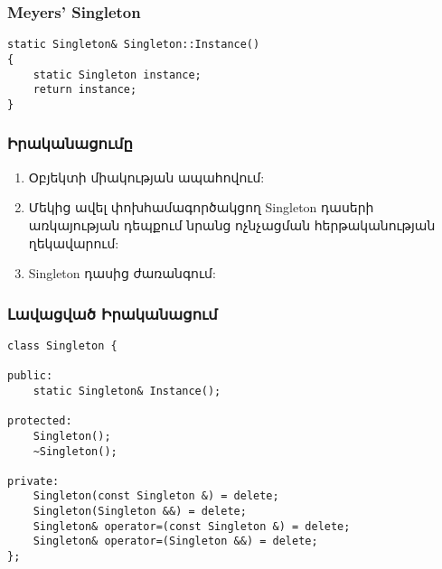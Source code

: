 \documentclass{beamer}
\begin{document}
\begin{frame}[fragile]\frametitle{Meyers' Singleton}
\begin{english}
\begin{verbatim}
static Singleton& Singleton::Instance()
{
    static Singleton instance;
    return instance;
}
\end{verbatim}
\end{english}
\end{frame}

\begin{frame}\frametitle{Իրականացումը}
\begin{enumerate}
    \item Օբյեկտի միակության ապահովում: \vfill
    \item Մեկից ավել փոխհամագործակցող Singleton դասերի առկայության
    դեպքում նրանց ոչնչացման հերթականության ղեկավարում: \vfill
    \item Singleton դասից ժառանգում:
\end{enumerate}
\end{frame}

\begin{frame}[fragile]\frametitle{Լավացված Իրականացում}
\begin{english}
\begin{verbatim}
class Singleton {

public:
    static Singleton& Instance();

protected:
    Singleton();
    ~Singleton();

private:
    Singleton(const Singleton &) = delete;
    Singleton(Singleton &&) = delete;
    Singleton& operator=(const Singleton &) = delete;
    Singleton& operator=(Singleton &&) = delete;
};
\end{verbatim}
\end{english}
\end{frame}
\end{document}
